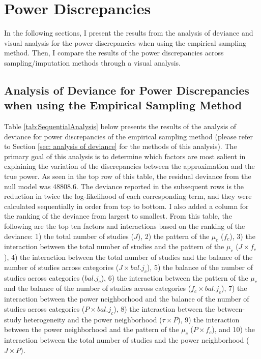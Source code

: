 \section{Power Discrepancies}

In the following sections, I present the results from the analysis of deviance and visual analysis for the power discrepancies when using the empirical sampling method. Then, I compare the results of the power discrepancies across sampling/imputation methods through a visual analysis.   

\subsection{Analysis of Deviance for Power Discrepancies when using the Empirical Sampling Method} \label{sec: analysis of deviance - empirical}

Table \ref{tab:SequentialAnalysis} below presents the results of the analysis of deviance for power discrepancies of the empirical sampling method (please refer to Section \ref{sec: analysis of deviance} for the methods of this analysis). The primary goal of this analysis is to determine which factors are most salient in explaining the variation of the discrepancies between the approximation and the true power. As seen in the top row of this table, the residual deviance from the null model was 48808.6. The deviance reported in the subsequent rows is the reduction in twice the log-likelihood of each corresponding term, and they were calculated sequentially in order from top to bottom. I also added a column for the ranking of the deviance from largest to smallest. From this table, the following are the top ten factors and interactions based on the ranking of the deviance: 1) the total number of studies ($J$), 2) the pattern of the $\mu_c$ ($f_c$), 3) the interaction between the total number of studies and the pattern of the $\mu_c$  ($J \times f_c$), 4) the interaction between the total number of studies and the balance of the number of studies across categories ($J \times bal. j_c$), 5) the balance of the number of studies across categories ($bal. j_c$), 6) the interaction between the pattern of the $\mu_c$ and the balance of the number of studies across categories ($f_c \times bal. j_c$), 7) the interaction between the power neighborhood and the balance of the number of studies across categories ($P \times bal. j_c$), 8) the interaction between the between-study heterogeneity and the power neighborhood ($\tau \times P$), 9) the interaction between the power neighborhood and the pattern of the $\mu_c$ ($P \times f_c$), and 10) the interaction between the total number of studies and the power neighborhood  ($J \times P$). 

